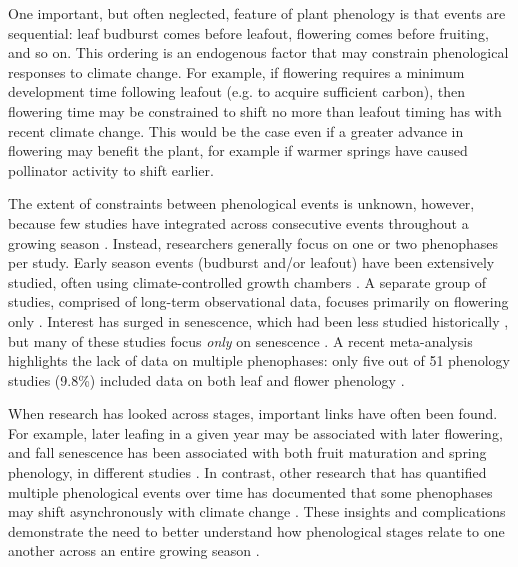 \documentclass{article}
\begin{document}
\par One important, but often neglected, feature of plant phenology is that events are sequential: leaf budburst comes before leafout, flowering comes before fruiting, and so on. This ordering is an endogenous factor that may constrain phenological responses to climate change. For example, if flowering requires a minimum development time following leafout (e.g. to acquire sufficient carbon), then flowering time may be constrained to shift no more than leafout timing has with recent climate change. This would be the case even if a greater advance in flowering may benefit the plant, for example if warmer springs have caused pollinator activity to shift earlier.%

\par The extent of constraints between phenological events is unknown, however, because few studies have integrated across consecutive events throughout a growing season \citep{wolkovich2014}. Instead, researchers generally focus on one or two phenophases per study. Early season events (budburst and/or leafout) have been extensively studied, often using climate-controlled growth chambers \citep[e.g.,][]{basler2012,laube2014}. A separate group of studies, comprised of long-term observational data, focuses primarily on flowering only \citep[e.g.,] []{fitter2002,millerrushing2008}. Interest has surged in senescence, which had been less studied historically \citep {parmesan2006}, but many of these studies focus \textit{only} on senescence \citep[e.g.,][]{taylor2008,archetti2013,jeong2014}. A recent meta-analysis highlights the lack of data on multiple phenophases: only five out of 51 phenology studies (9.8\%) included data on both leaf and flower phenology \citep{wolkovich2012}. 

\par When research has looked across stages, important links have often been found. For example, later leafing in a given year may be associated with later flowering, and fall senescence has been associated with both fruit maturation and spring phenology, in different studies \citep{lechowicz1995,keenan2015,liu2016}. In contrast, other research that has quantified multiple phenological events over time has documented that some phenophases may shift asynchronously with climate change \citep[e.g., spring events are occurring earlier as fall events have gotten later, first-flower dates have shifted earlier whereas last-flower dates have not,][]{menzel2006,caradonna2014}. These insights and complications demonstrate the need to better understand how phenological stages relate to one another across an entire growing season \citep{wolkovich2014}.
\end{document}
